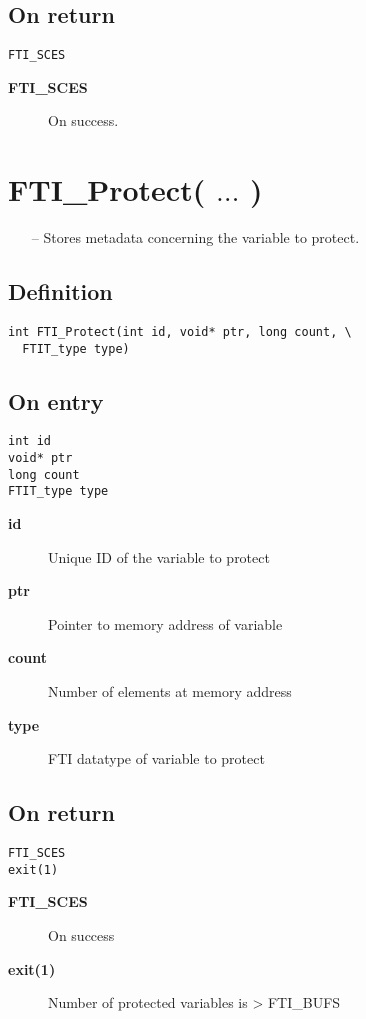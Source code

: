 \documentclass{refrep}
\begin{document}
\subsection*{On return}
\begin{lstlisting}[frame=single]
FTI_SCES
\end{lstlisting}
\begin{description}
\item[\textbf{FTI\_SCES}] On success.
\end{description}
\newpage
\section{\asciifamily FTI\_Protect( $\dots$ )}\label{sec:ftiprotect}
\begin{framed}
\begin{itemize}
\item[--] Stores metadata concerning the variable to protect.
\end{itemize}
\end{framed}
\subsection*{Definition}
\begin{lstlisting}[frame=single]
int FTI_Protect(int id, void* ptr, long count, \
  FTIT_type type)
\end{lstlisting}
\subsection*{On entry}
\begin{lstlisting}[frame=single]
int id
void* ptr
long count
FTIT_type type
\end{lstlisting}
\begin{description}
\item[\textbf{id}] Unique ID of the variable to protect
\item[\textbf{ptr}] Pointer to memory address of variable
\item[\textbf{count}] Number of elements at memory address
\item[\textbf{type}] FTI datatype of variable to protect
\end{description}
\subsection*{On return}
\begin{lstlisting}[frame=single]
FTI_SCES
exit(1)
\end{lstlisting}
\begin{description}
\item[\textbf{FTI\_SCES}] On success
\item[\textbf{exit(1)}] Number of protected variables is > FTI\_BUFS
\end{description}
\newpage
\end{document}
